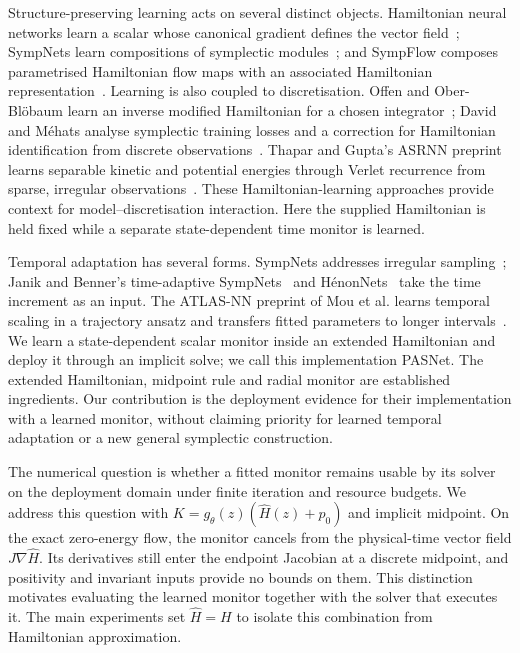 \documentclass[final,3p,times]{elsarticle}
\begin{document}
Structure-preserving learning acts on several distinct objects.
Hamiltonian neural networks learn a scalar whose canonical gradient
defines the vector field~\cite{Greydanus2019}; SympNets learn compositions
of symplectic modules~\cite{Jin2020}; and SympFlow composes parametrised
Hamiltonian flow maps with an associated Hamiltonian
representation~\cite{Canizares2024}. Learning is also coupled to
discretisation. Offen and Ober-Bl\"obaum learn an inverse modified
Hamiltonian for a chosen integrator~\cite{Offen2022}; David and M\'ehats
analyse symplectic training losses and a correction for Hamiltonian
identification from discrete observations~\cite{David2023}. Thapar and
Gupta's ASRNN preprint learns separable kinetic and potential energies
through Verlet recurrence from sparse, irregular
observations~\cite{Thapar2026}. These Hamiltonian-learning approaches
provide context for model--discretisation interaction. Here the supplied
Hamiltonian is held fixed while a separate state-dependent time monitor
is learned.

Temporal adaptation has several forms. SympNets addresses irregular
sampling~\cite{Jin2020}; Janik and Benner's time-adaptive
SympNets~\cite{Janik2025} and H\'enonNets~\cite{Janik2026} take the time
increment as an input. The ATLAS-NN preprint of Mou et al. learns temporal
scaling in a trajectory ansatz and transfers fitted parameters to longer
intervals~\cite{Mou2026}. We learn a state-dependent scalar monitor inside
an extended Hamiltonian and deploy it through an implicit solve; we call
this implementation PASNet. The extended Hamiltonian, midpoint rule and
radial monitor are established ingredients. Our contribution is the
deployment evidence for their implementation with a learned monitor,
without claiming priority for learned temporal adaptation or a new general
symplectic construction.

The numerical question is whether a fitted monitor remains usable by its
solver on the deployment domain under finite iteration and resource
budgets. We address this question with $K=g_\theta(z)(\widehat H(z)+p_0)$
and implicit midpoint. On the exact zero-energy flow, the monitor cancels
from the physical-time vector field $J\nabla\widehat H$. Its derivatives
still enter the endpoint Jacobian at a discrete midpoint, and positivity
and invariant inputs provide no bounds on them. This distinction motivates
evaluating the learned monitor together with the solver that executes it.
The main experiments set $\widehat H=H$ to isolate this combination from
Hamiltonian approximation.
\end{document}

